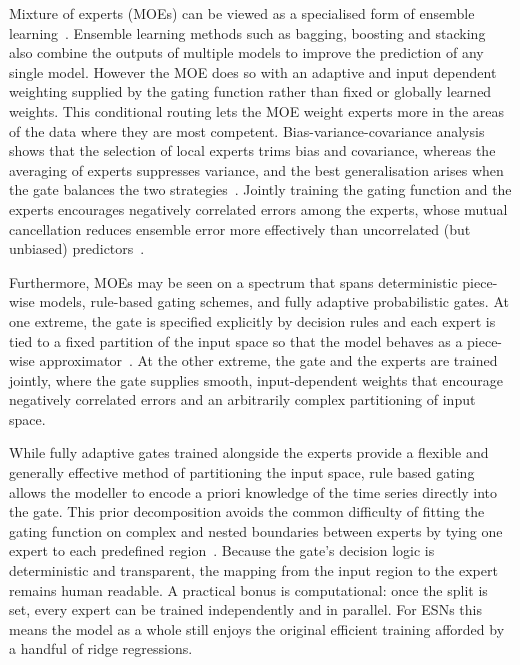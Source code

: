 Mixture of experts (MOEs) can be viewed as a specialised form of ensemble learning~\cite{masoudnia_2014}. Ensemble learning methods such as bagging, boosting and stacking also combine the outputs of multiple models to improve the prediction of any single model. However the MOE does so with an adaptive and input dependent weighting supplied by the gating function rather than fixed or globally learned weights. This conditional routing lets the MOE weight experts more in the areas of the data where they are most competent. Bias-variance-covariance analysis shows that the selection of local experts trims bias and covariance, whereas the averaging of experts suppresses variance, and the best generalisation arises when the gate balances the two strategies~\cite{masoudnia_2014}. Jointly training the gating function and the experts encourages negatively correlated errors among the experts, whose mutual cancellation reduces ensemble error more effectively than uncorrelated (but unbiased) predictors~\cite{masoudnia_2014}.


Furthermore, MOEs may be seen on a spectrum that spans deterministic piece-wise models, rule-based gating schemes, and fully adaptive probabilistic gates. At one extreme, the gate is specified explicitly by decision rules and each expert is tied to a fixed partition of the input space so that the model behaves as a piece-wise approximator~\cite{masoudnia_2014}. At the other extreme, the gate and the experts are trained jointly, where the gate supplies smooth, input-dependent weights that encourage negatively correlated errors and an arbitrarily complex partitioning of input space.

While fully adaptive gates trained alongside the experts provide a flexible and generally effective method of partitioning the input space, rule based gating allows the modeller to encode a priori knowledge of the time series directly into the gate. This prior decomposition avoids the common difficulty of fitting the gating function on complex and nested boundaries between experts by tying one expert to each predefined region~\cite{masoudnia_2014}. Because the gate's decision logic is deterministic and transparent, the mapping from the input region to the expert remains human readable. A practical bonus is computational: once the split is set, every expert can be trained independently and in parallel. For ESNs this means the model as a whole still enjoys the original efficient training afforded by a handful of ridge regressions.

